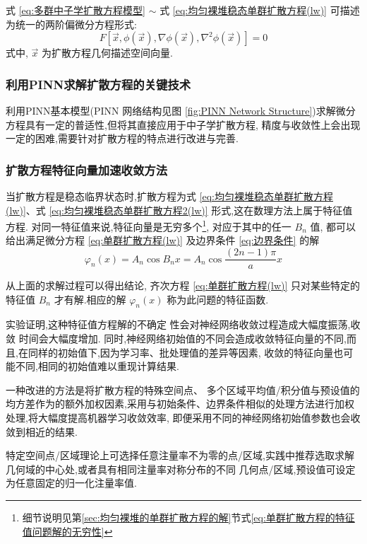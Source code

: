 \documentclass{Sichuan Normal University}
\begin{document}
式 \eqref{eq:多群中子学扩散方程模型}  $\sim$ 式 \eqref{eq:均匀裸堆稳态单群扩散方程(lw)} 可描述为统一的两阶偏微分方程形式:
\begin{equation}
F\left[\vec{x}, \phi(\vec{x}), \nabla \phi(\vec{x}), \nabla^2 \phi(\vec{x})\right]=0
\end{equation}
式中, $\vec{x}$ 为扩散方程几何描述空间向量.

\subsubsection{利用PINN求解扩散方程的关键技术}
利用PINN基本模型(PINN 网络结构见图 \ref{fig:PINN Network Structure})求解微分方程具有一定的普适性,但将其直接应用于中子学扩散方程, 精度与收敛性上会出现一定的困难,需要针对扩散方程的特点进行改进与完善.
\subsubsection{扩散方程特征向量加速收敛方法}\label{sec:扩散方程特征向量加速收敛方法}
当扩散方程是稳态临界状态时,扩散方程为式 \eqref{eq:均匀裸堆稳态单群扩散方程(lw)}、式 \eqref{eq:均匀裸堆稳态单群扩散方程2(lw)} 形式,这在数理方法上属于特征值方程.
对同一特征值来说,特征向量是无穷多个\footnote{细节说明见第\ref{sec:均匀裸堆的单群扩散方程的解}节式\eqref{eq:单群扩散方程的特征值问题解的无穷性}}, 对应于其中的任一 $B_n$ 值, 都可以给出满足微分方程 \eqref{eq:单群扩散方程(lw)} 及边界条件 \eqref{eq:边界条件} 的解
\begin{equation}
\varphi_n(x)=A_n \cos B_n x=A_n \cos \frac{(2 n-1) \pi}{a} x
\label{eq:单群扩散方程的特征值问题解的无穷性}
\end{equation}

从上面的求解过程可以得出结论, 齐次方程 \eqref{eq:单群扩散方程(lw)} 只对某些特定的特征值 $B_n$ 才有解.相应的解 $\varphi_n(x)$ 称为此问题的特征函数.

实验证明,这种特征值方程解的不确定 性会对神经网络收敛过程造成大幅度振荡,收敛 时间会大幅度增加.
同时,神经网络初始值的不同会造成收敛特征向量的不同,而且,在同样的初始值下,因为学习率、批处理值的差异等因素, 收敛的特征向量也可能不同,相同的初始值难以重现计算结果.

一种改进的方法是将扩散方程的特殊空间点、 多个区域平均值/积分值与预设值的均方差作为的额外加权因素,采用与初始条件、边界条件相似的处理方法进行加权处理,将大幅度提高机器学习收敛效率,
即便采用不同的神经网络初始值参数也会收敛到相近的结果. 

特定空间点/区域理论上可选择任意注量率不为零的点/区域,实践中推荐选取求解几何域的中心处,或者具有相同注量率对称分布的不同 几何点/区域,预设值可设定为任意固定的归一化注量率值. 
\end{document}
